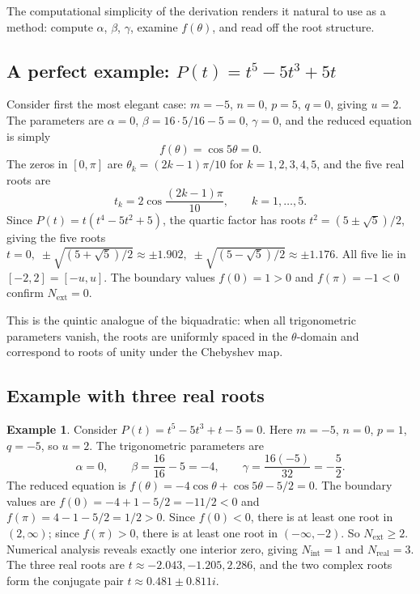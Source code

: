 \documentclass[12pt]{article}
\theoremstyle{definition}
\newtheorem{example}[theorem]{Example}
\theoremstyle{remark}
\begin{document}
The computational simplicity of the derivation renders it natural to use as a method: compute $\alpha$, $\beta$, $\gamma$, examine $f(\theta)$, and read off the root structure.

\subsection{A perfect example: $P(t) = t^5 - 5t^3 + 5t$}

Consider first the most elegant case: $m = -5$, $n = 0$, $p = 5$, $q = 0$, giving $u = 2$. The parameters are $\alpha = 0$, $\beta = 16 \cdot 5/16 - 5 = 0$, $\gamma = 0$, and the reduced equation is simply
\begin{equation}\label{eq:cos5}
f(\theta) = \cos 5\theta = 0.
\end{equation}
The zeros in $[0,\pi]$ are $\theta_k = (2k-1)\pi/10$ for $k = 1, 2, 3, 4, 5$, and the five real roots are
\[
t_k = 2\cos\frac{(2k-1)\pi}{10}, \qquad k = 1, \ldots, 5.
\]
Since $P(t) = t(t^4 - 5t^2 + 5)$, the quartic factor has roots $t^2 = (5 \pm \sqrt{5})/2$, giving the five roots $t = 0, \;\pm\sqrt{(5+\sqrt{5})/2} \approx \pm 1.902, \;\pm\sqrt{(5-\sqrt{5})/2} \approx \pm 1.176$. All five lie in $[-2, 2] = [-u, u]$. The boundary values $f(0) = 1 > 0$ and $f(\pi) = -1 < 0$ confirm $N_{\mathrm{ext}} = 0$.

This is the quintic analogue of the biquadratic: when all trigonometric parameters vanish, the roots are uniformly spaced in the $\theta$-domain and correspond to roots of unity under the Chebyshev map.

\subsection{Example with three real roots}

\begin{example}\label{ex:three}
Consider $P(t) = t^5 - 5t^3 + t - 5 = 0$. Here $m = -5$, $n = 0$, $p = 1$, $q = -5$, so $u = 2$. The trigonometric parameters are
\[
\alpha = 0, \qquad \beta = \frac{16}{16} - 5 = -4, \qquad \gamma = \frac{16(-5)}{32} = -\frac{5}{2}.
\]
The reduced equation is $f(\theta) = -4\cos\theta + \cos 5\theta - 5/2 = 0$. The boundary values are $f(0) = -4 + 1 - 5/2 = -11/2 < 0$ and $f(\pi) = 4 - 1 - 5/2 = 1/2 > 0$. Since $f(0) < 0$, there is at least one root in $(2, \infty)$; since $f(\pi) > 0$, there is at least one root in $(-\infty, -2)$. So $N_{\mathrm{ext}} \geq 2$. Numerical analysis reveals exactly one interior zero, giving $N_{\mathrm{int}} = 1$ and $N_{\mathrm{real}} = 3$. The three real roots are $t \approx -2.043, -1.205, 2.286$, and the two complex roots form the conjugate pair $t \approx 0.481 \pm 0.811i$.
\end{example}
\end{document}
